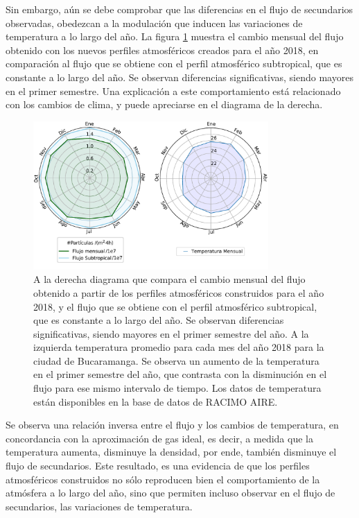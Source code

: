 Sin embargo, aún se debe comprobar que las diferencias en el flujo de secundarios observadas, obedezcan a la modulación que inducen las variaciones de temperatura a lo largo del año. La figura \ref{fig:fig21} muestra el cambio mensual del flujo obtenido con los nuevos perfiles atmosféricos creados para el año 2018, en comparación al flujo que se obtiene con el perfil atmosférico subtropical, que es constante a lo largo del año. Se observan diferencias significativas, siendo mayores en el primer semestre. Una explicación a este comportamiento está relacionado con los cambios de clima, y puede apreciarse en el diagrama de la derecha.\\

\begin{figure}[htb!]
\centering
\includegraphics[width=0.8\textwidth]{Figs/Flujo_TEMP.pdf}
\caption[Comparación del flujo, atmósferas mensuales vs perfil predeterminado.]{A la derecha diagrama que compara el cambio mensual del flujo obtenido a partir de los perfiles atmosféricos construidos para el año 2018, y el flujo que se obtiene con el perfil atmosférico subtropical, que es constante a lo largo del año. Se observan diferencias significativas, siendo mayores en el primer semestre del año. A la izquierda temperatura promedio para cada mes del año 2018 para la ciudad de Bucaramanga. Se observa un aumento de la temperatura en el primer semestre del año, que contrasta con la disminución en el flujo para ese mismo intervalo de tiempo. Los datos de temperatura están disponibles en la base de datos de RACIMO AIRE. \citep{Datos}}
\label{fig:fig21}
\end{figure}

Se observa una relación inversa entre el flujo y los cambios de temperatura, en concordancia con la aproximación de gas ideal, es decir, a medida que la temperatura aumenta, disminuye la densidad, por ende, también disminuye el flujo de secundarios. Este resultado, es una evidencia de que los perfiles atmosféricos construidos no sólo reproducen bien el comportamiento de la atmósfera a lo largo del año, sino que permiten incluso observar en el flujo de secundarios, las variaciones de temperatura. \\

